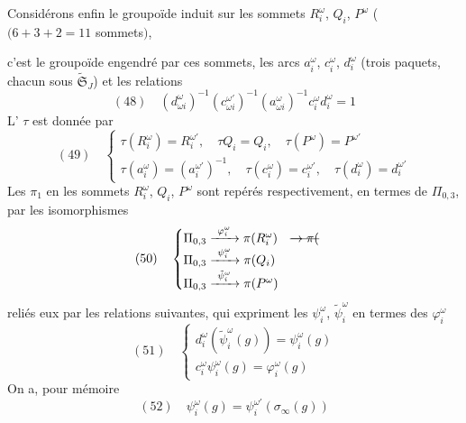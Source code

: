 \documentclass[11pt,a4paper]{article}
\begin{document}
Considérons enfin le groupoïde induit sur les  sommets $R_i^{\omega}$, $Q_i$, $P^{\omega}$ ($(6+3+2 = 11$ sommets$)$,

c'est le groupoïde engendré par ces sommets, les arcs $a_i^{\omega}$, $c_i^{\omega}$, $d_i^{\omega}$ (trois paquets, \struck{\ill{}} chacun  sous $\widetilde{\mathfrak{S}}_J$) et les  relations
\[
(48)\quad (d^{\omega}_{\omega i})^{-1} (c^{\omega'}_{\omega i})^{-1} (a^{\omega}_{\omega i})^{-1} c_i^{\omega} d_i^{\omega} = 1
\]
L'  $\tau$ est donnée par
\[
(49)\quad
\begin{cases}
\tau(R_i^{\omega}) = R_i^{\omega'}, \quad \tau Q_i = Q_i, \quad \tau(P^{\omega}) = P^{\omega'} \\
\tau(a_i^{\omega}) = (a_i^{\omega'})^{-1}, \quad \tau(c_i^{\omega}) = c_i^{\omega'}, \quad \tau(d_i^{\omega}) = d_i^{\omega'}
\end{cases}
\]
Les $\pi_1$ en les sommets $R_i^{\omega}$, $Q_i$, $P^{\omega}$ sont repérés respectivement, en termes de $\Pi_{0,3}$, par les isomorphismes
\[
(50)\quad
\begin{cases}
\Pi_{0,3} \xrightarrow{\ \varphi_i^{\omega}\ } \pi(R_i^{\omega}) \quad \text{\struck{$\to \pi($}} \\
\Pi_{0,3} \xrightarrow{\ \psi_i^{\omega}\ } \pi(Q_i) \\
\Pi_{0,3} \xrightarrow{\ \tilde\psi_i^{\omega}\ } \pi(P^{\omega})
\end{cases}
\]
reliés   eux par les relations suivantes, qui  expriment les $\psi_i^{\omega}$, $\tilde\psi_i^{\omega}$ en termes des $\varphi_i^{\omega}$
\[
(51)\quad
\begin{cases}
d_i^{\omega}(\tilde\psi_i^{\omega}(g)) = \psi_i^{\omega}(g) \\
c_i^{\omega} \psi_i^{\omega}(g) = \varphi_i^{\omega}(g)
\end{cases}
\]
On a, pour mémoire
\[
(52)\quad \psi_i^{\omega}(g) = \psi_i^{\omega'}(\sigma_\infty(g))
\]
\end{document}
